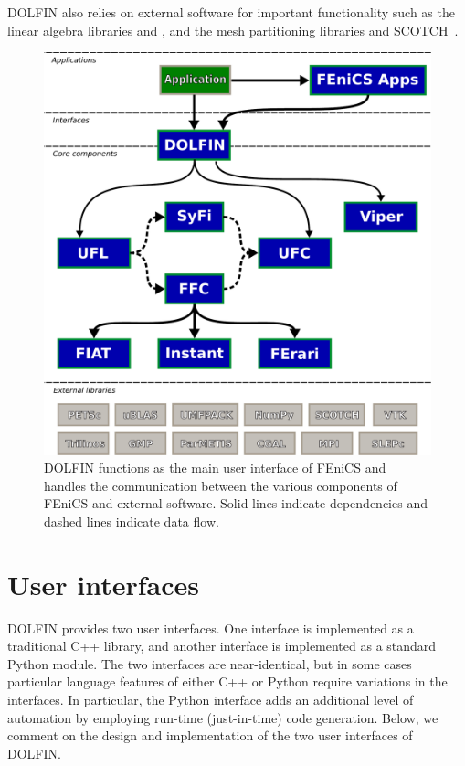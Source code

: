 DOLFIN also relies on external software for important functionality
such as the linear algebra libraries
\citet{www:petsc,www:trilinos,www:ublas} and \citet{www:mtl4}, and the
mesh partitioning libraries \citet{www:parmetis} and
SCOTCH~\citep{www:scotch}.

\begin{figure}
  \center\includegraphics[width=\largefig]{chapters/logg-2/pdf/fenics-map.pdf}
  \caption{DOLFIN functions as the main user interface of FEniCS and
    handles the communication between the various components of FEniCS
    and external software. Solid lines indicate dependencies and
    dashed lines indicate data flow.}
  \label{fig:logg-2:fenicsmap}
\end{figure}

\section{User interfaces}

DOLFIN provides two user interfaces. One interface is implemented as a
traditional C++ library, and another interface is implemented as a
standard Python module. The two interfaces are near-identical, but in
some cases particular language features of either C++ or Python
require variations in the interfaces.  In particular, the Python
interface adds an additional level of automation by employing
run-time (just-in-time) code generation.  Below, we comment on the
design and implementation of the two user interfaces of DOLFIN.

